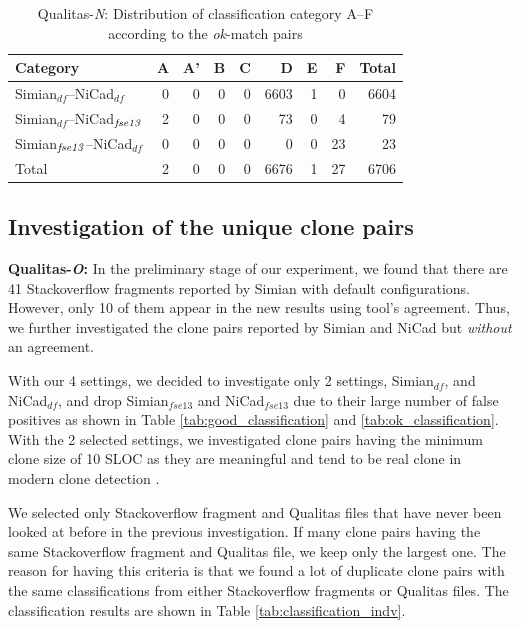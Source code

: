 \documentclass{IEEEtran}
\begin{document}
\begin{table}[H]
	\centering
	\caption{Qualitas-\textit{N}: Distribution of classification category A--F  according to the \textit{ok}-match pairs}
	\label{tab:ok_classification_new}
	\begin{tabular}{|l|r|r|r|r|r|r|r|r|}
		\hline 
		Category   																										& A   	& 	A' 	& 	B  & C	   & D   	&	E   &	F   & Total  \\
		\hline
		Simian$_{df}$--NiCad$_{df}$ & 0 & 0	& 0 & 0 & 6603 & 1 & 0 & 6604 \\
		Simian$_{df}$--NiCad$_{\textrm{\textit{fse13}}}$ 
		& 2 	& 0 	& 0 	& 0 	& 73 	 & 0 	  & 4 		&  79 \\
		Simian$_{\textrm{\textit{fse13}}}$--NiCad$_{df}$   									
		& 0 	& 0 	& 0 	& 0 	 & 0 	  & 0 		& 23 	& 23 \\
		\hline
		Total   & 2  	&   0   & 0   	&  0   &   6676   &   1   & 27  & 6706 \\
		\hline
	\end{tabular} 
\end{table}

\subsection{Investigation of the unique clone pairs}

\textbf{Qualitas-\textit{O}:} In the preliminary stage of our experiment, we found that there are 41 Stackoverflow fragments reported by Simian with default configurations. However, only 10 of them appear in the new results using tool's agreement. Thus, we further investigated the clone pairs reported by Simian and NiCad but \textit{without} an agreement. 

With our 4 settings, we decided to investigate only 2 settings, Simian$_{df}$, and NiCad$_{df}$, and drop Simian$_{fse13}$ and NiCad$_{fse13}$ due to their large number of false positives as shown in Table \ref{tab:good_classification} and \ref{tab:ok_classification}. With the 2 selected settings, we investigated clone pairs having the minimum clone size of 10 SLOC as they are meaningful and tend to be real clone in modern clone detection \cite{Sajnani2016}. 

We selected only Stackoverflow fragment and Qualitas files that have never been looked at before in the previous investigation. If many clone pairs having the same Stackoverflow fragment and Qualitas file, we keep only the largest one. The reason for having this criteria is that we found a lot of duplicate clone pairs with the same classifications from either Stackoverflow fragments or Qualitas files. The classification results are shown in Table \ref{tab:classification_indv}. 
\end{document}

